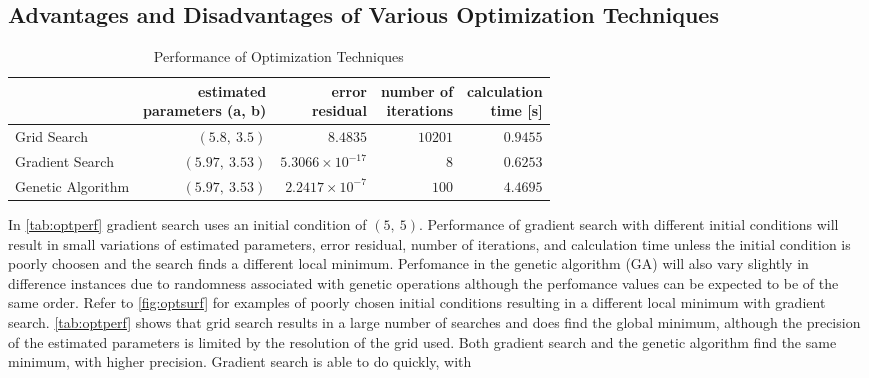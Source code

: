 \documentclass[11pt,a4paper]{article}
\begin{document}
\subsection{Advantages and Disadvantages of Various Optimization Techniques}
\begin{table}
    \centering
    \begin{tabular}{|l|r|r|r|r|}
        \hline
        \nonumber & \shortstack[c]{estimated\\parameters (a, b)} &
            \shortstack[c]{error\\residual} &
            \shortstack[c]{number of\\iterations} &
            \shortstack[c]{calculation\\time [s]} \\
        \hline
        Grid Search & $ (5.8,\: 3.5) $ & $ 8.4835 $ & $ 10201 $ &
            $ 0.9455 $ \\
        Gradient Search & $ (5.97,\: 3.53) $ & $ 5.3066 \times 10^{-17} $ &
            $ 8 $ & $ 0.6253 $ \\
        Genetic Algorithm & $ (5.97,\: 3.53) $ & $ 2.2417 \times 10^{-7} $ &
            $ 100 $ & $ 4.4695 $ \\
        \hline
    \end{tabular}
    \caption{Performance of Optimization Techniques}
    \label{tab:optperf}
\end{table}
In \autoref{tab:optperf} gradient search uses an initial condition of $ (5,\:
5) $. Performance of gradient search with different initial conditions will
result in small variations of estimated parameters, error residual, number of
iterations, and calculation time unless the initial condition is poorly choosen
and the search finds a different local minimum. Perfomance in the genetic
algorithm (GA) will also vary slightly in difference instances due to
randomness associated with genetic operations although the perfomance values
can be expected to be of the same order. Refer to \autoref{fig:optsurf} for
examples of poorly chosen initial conditions resulting in a different local
minimum with gradient search. \autoref{tab:optperf} shows that grid search
results in a large number of searches and does find the global minimum,
although the precision of the estimated parameters is limited by the resolution
of the grid used. Both gradient search and the genetic algorithm find the same
minimum, with higher precision. Gradient search is able to do quickly, with
\end{document}
